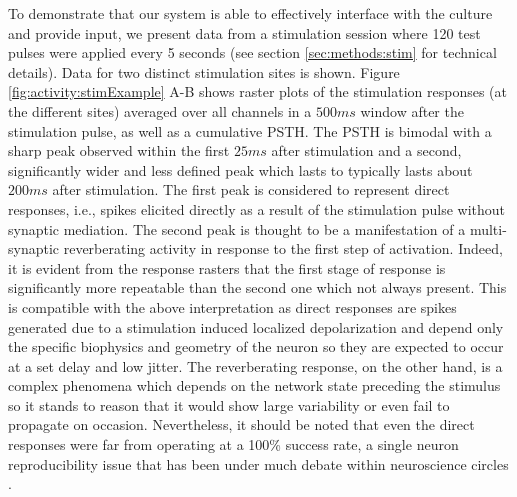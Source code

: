     To demonstrate that our system is able to effectively interface with the culture and provide input, we present data from a stimulation session where 120 test pulses were applied every 5 seconds (see section \ref{sec:methods:stim} for technical details). Data for two distinct stimulation sites is shown. Figure \ref{fig:activity:stimExample} A-B shows raster plots of the stimulation responses (at the different sites) averaged over all channels in a \(500 ms\) window after the stimulation pulse, as well as a cumulative PSTH. The PSTH is bimodal with a sharp peak observed within the first \(25 ms\) after stimulation and a second, significantly wider and less defined peak which lasts to typically lasts about \(200 ms\) after stimulation. The first peak is considered to represent direct responses, i.e., spikes elicited directly as a result of the stimulation pulse without synaptic mediation. The second peak is thought to be a manifestation of a multi-synaptic reverberating activity in response to the first step of activation. Indeed, it is evident from the response rasters that the first stage of response is significantly more repeatable than the second one which not always present. This is compatible with the above interpretation as direct responses are spikes generated due to a stimulation induced localized depolarization and depend only the specific biophysics and geometry of the neuron so they are expected to occur at a set delay and low jitter. The reverberating response, on the other hand, is a complex phenomena which depends on the network state preceding the stimulus so it stands to reason that it would show large variability or even fail to propagate on occasion. Nevertheless, it should be noted that even the direct responses were far from operating at a 100\% success rate, a single neuron reproducibility issue that has been under much debate within neuroscience circles \cite{mainen1995reliability,gal2013entrainment}.


